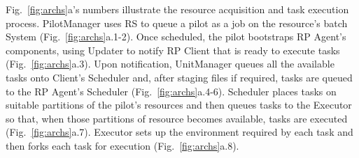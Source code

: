 

Fig.~\ref{fig:archs}a's numbers illustrate the resource acquisition and task
execution process. PilotManager uses RS to queue a pilot as a job on the
resource's batch System (Fig.~\ref{fig:archs}a.1-2). Once scheduled, the
pilot bootstraps RP Agent's components, using Updater to notify RP Client
that is ready to execute tasks (Fig.~\ref{fig:archs}a.3). Upon notification,
UnitManager queues all the available tasks onto Client's Scheduler and, after
staging files if required, tasks are queued to the RP Agent's Scheduler
(Fig.~\ref{fig:archs}a.4-6). Scheduler places tasks on suitable partitions of
the pilot's resources and then queues tasks to the Executor so that, when
those partitions of resource becomes available, tasks are executed
(Fig.~\ref{fig:archs}a.7). Executor sets up the environment required by each
task and then forks each task for execution (Fig.~\ref{fig:archs}a.8). 

